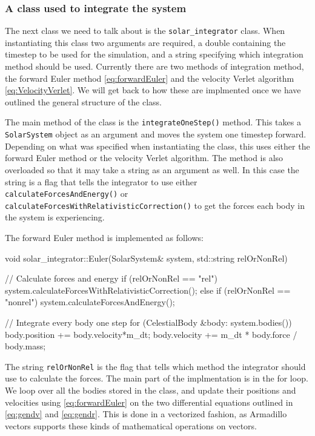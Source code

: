 \documentclass[reprint,english,notitlepage]{revtex4-1}  %
\begin{document}
\subsubsection{A class used to integrate the system} \label{sec:III:a:3}

The next class we need to talk about is the \verb+solar_integrator+ class. When instantiating this class two arguments are required, a double containing the timestep to be used for the simulation, and a string specifying which integration method should be used. Currently there are two methods of integration method, the forward Euler method \eqref{eq:forwardEuler} and the velocity Verlet algorithm \eqref{eq:VelocityVerlet}. We will get back to how these are implmented once we have outlined the general structure of the class. 

The main method of the class is the \verb+integrateOneStep()+ method. This takes a \verb+SolarSystem+ object as an argument and moves the system one timestep forward. Depending on what was specified when instantiating the class, this uses either the forward Euler method or the velocity Verlet algorithm. The method is also overloaded so that it may take a string as an argument as well. In this case the string is a flag that tells the integrator to use either \verb+calculateForcesAndEnergy()+ or \verb+calculateForcesWithRelativisticCorrection()+ to get the forces each body in the system is experiencing. 

The forward Euler method is implemented as follows:
\begin{cpp}
void solar_integrator::Euler(SolarSystem& system, 
							 std::string relOrNonRel) {
  // Calculate forces and energy
  if (relOrNonRel == "rel") {
    system.calculateForcesWithRelativisticCorrection();
  } else if (relOrNonRel == "nonrel") {
    system.calculateForcesAndEnergy();
  }

  // Integrate every body one step
  for (CelestialBody &body: system.bodies()) {
    body.position += body.velocity*m_dt;
    body.velocity += m_dt * body.force / body.mass;
  }
}
\end{cpp} 

The string \verb+relOrNonRel+ is the flag that tells which method the integrator should use to calculate the forces.    The main part of the implmentation is in the for loop. We loop over all the bodies stored in the class, and update their positions and velocities using \eqref{eq:forwardEuler} on the two differential equations outlined in \eqref{eq:gendv} and \eqref{eq:gendr}. This is done in a vectorized fashion, as Armadillo \citep{Armadillo} vectors supports these kinds of mathematical operations on vectors.
\end{document}
